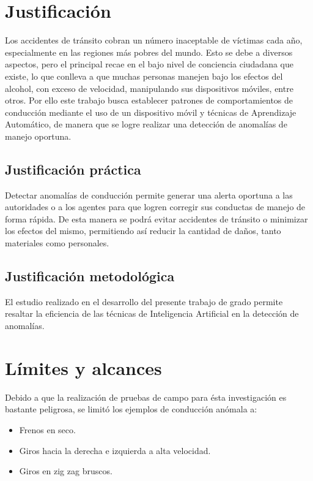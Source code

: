 
\section{Justificación}

Los accidentes de tránsito cobran un número inaceptable de víctimas cada a\~{n}o, especialmente en las regiones m\'{a}s pobres del mundo. Esto se debe a diversos aspectos, pero el principal recae en el bajo nivel de conciencia ciudadana que existe, lo que conlleva a que muchas personas manejen bajo los efectos del alcohol, con exceso de velocidad, manipulando sus dispositivos m\'{o}viles, entre otros. Por ello este trabajo busca establecer patrones de comportamientos de conducci\'{o}n mediante el uso de un dispositivo m\'{o}vil y t\'{e}cnicas de Aprendizaje Autom\'{a}tico, de manera que se logre realizar una detecci\'{o}n de anomal\'{i}as de manejo oportuna.

\subsection{Justificaci\'{o}n pr\'{a}ctica}

Detectar anomal\'{i}as de conducci\'{o}n permite generar una alerta oportuna a las autoridades o a los agentes para que logren corregir sus conductas de manejo de forma r\'{a}pida. De esta manera se podr\'{a} evitar accidentes de tr\'{a}nsito o minimizar los efectos del mismo, permitiendo as\'{i} reducir la cantidad de da\~{n}os, tanto materiales como personales.

\subsection{Justificaci\'{o}n metodol\'{o}gica}

El estudio realizado en el desarrollo del presente trabajo de grado permite resaltar la eficiencia de las t\'{e}cnicas de Inteligencia Artificial en la detecci\'{o}n de anomal\'{i}as.

\section{L\'{i}mites y alcances}

Debido a que la realizaci\'{o}n de pruebas de campo para \'{e}sta investigaci\'{o}n es bastante peligrosa, se limit\'{o} los ejemplos de conducci\'{o}n an\'{o}mala a:

\begin{itemize}
\item Frenos en seco.
\item Giros hacia la derecha e izquierda a alta velocidad.
\item Giros en zig zag bruscos.
\end{itemize}

